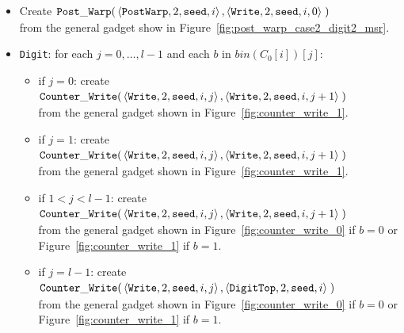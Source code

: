 \begin{itemize}
    \item Create
    $\begin{aligned}[t]
        {\tt Post\_Warp}(&\left\langle {\tt PostWarp}, 2, {\tt seed}, i    \right\rangle,
                   \left\langle {\tt Write},    2, {\tt seed}, i, 0 \right\rangle \;)
    \end{aligned}$\\ from the general gadget show in Figure~\ref{fig:post_warp_case2_digit2_msr}.


    \item {\tt Digit}: for each $j=0,\ldots,l-1$ and each $b$ in $bin(C_0[i])[j]$:
    \begin{itemize}
        \item if $j = 0$: create
        $\begin{aligned}[t]
            {\tt Counter\_Write}(&\left\langle {\tt Write}, 2, {\tt seed}, i, j \right\rangle, \left\langle {\tt Write}, 2, {\tt seed}, i, j + 1 \right\rangle \;)
        \end{aligned}$\\from the general gadget shown in Figure~\ref{fig:counter_write_1}.

        \item if $j = 1$: create
        $\begin{aligned}[t]
            {\tt Counter\_Write}(&\left\langle {\tt Write}, 2, {\tt seed}, i, j \right\rangle, \left\langle {\tt Write}, 2, {\tt seed}, i, j + 1 \right\rangle \;)
        \end{aligned}$\\from the general gadget shown in Figure~\ref{fig:counter_write_1}.

        \item if $1 < j < l-1$: create
        $\begin{aligned}[t]
            {\tt Counter\_Write}(&\left\langle {\tt Write}, 2, {\tt seed}, i, j \right\rangle, \left\langle {\tt Write}, 2, {\tt seed}, i, j + 1 \right\rangle \;)
        \end{aligned}$\\from the general gadget shown in Figure~\ref{fig:counter_write_0} if $b = 0$ or Figure~\ref{fig:counter_write_1} if $b = 1$.

        \item if $j = l-1$: create
        $\begin{aligned}[t]
            {\tt Counter\_Write}(&\left\langle {\tt Write}, 2, {\tt seed}, i, j \right\rangle, \left\langle {\tt DigitTop}, 2, {\tt seed}, i \right\rangle \;)
        \end{aligned}$\\from the general gadget shown in Figure~\ref{fig:counter_write_0} if $b = 0$ or Figure~\ref{fig:counter_write_1} if $b = 1$.
    \end{itemize}


\end{itemize}
